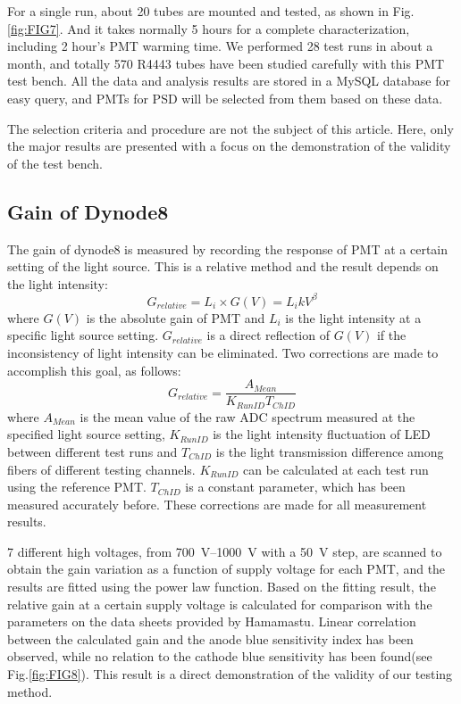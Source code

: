 \documentclass[review, times]{elsarticle}
\begin{document}
For a single run, about 20 tubes are mounted and tested, as shown in Fig.\ref{fig:FIG7}.
And it takes normally 5 hours for a complete characterization, including 2 hour's PMT warming time. 
We performed 28 test runs in about a month, and totally 570 R4443 tubes have been studied carefully with this PMT test bench. 
All the data and analysis results are stored in a MySQL database for easy query, and PMTs for PSD will be selected from them based on these data.

The selection criteria and procedure are not the subject of this article.
Here, only the major results are presented with a focus on the demonstration of the validity of the test bench. 

\subsection{Gain of Dynode8}
\label{sec:psd_gain}

The gain of dynode8 is measured by recording the response of PMT at a certain setting of the light source. 
This is a relative method and the result depends on the light intensity:
\begin{equation}
 G_{relative} = L_i \times G(V) = L_i k V^\beta
\end{equation}
where $G(V)$ is the absolute gain of PMT and $L_i$ is the light intensity at a specific light source setting.
$G_{relative}$ is a direct reflection of $G(V)$ if the inconsistency of light intensity can be eliminated.
Two corrections are made to accomplish this goal, as follows: 
\begin{equation}
 G_{relative} = \frac{A_{Mean}}{K_{RunID} T_{ChID}}
\end{equation} 
where $A_{Mean}$ is the mean value of the raw ADC spectrum measured at the specified light source setting,
$K_{RunID}$ is the light intensity fluctuation of LED between different test runs and $T_{ChID}$ is the light transmission difference among fibers of different testing channels.
$K_{RunID}$ can be calculated at each test run using the reference PMT.
$T_{ChID}$ is a constant parameter, which has been measured accurately before.
These corrections are made for all measurement results.

7 different high voltages, from \SIrange{700}{1000}{\volt} with a \SI{50}{\volt} step, are scanned to obtain the gain variation as a function of supply voltage for each PMT, and the results are fitted using the power law function.
Based on the fitting result, the relative gain at a certain supply voltage is calculated for comparison with the parameters on the data sheets provided by Hamamastu.
Linear correlation between the calculated gain and the anode blue sensitivity index has been observed, while no relation to the cathode blue sensitivity has been found(see Fig.\ref{fig:FIG8}).
This result is a direct demonstration of the validity of our testing method.
\end{document}
